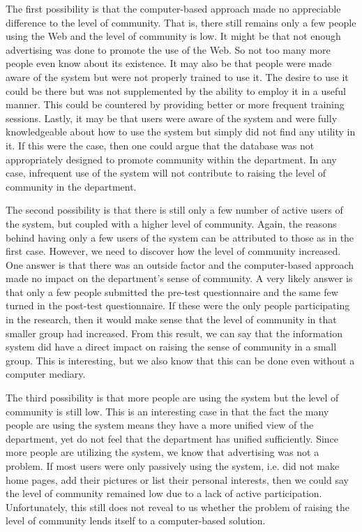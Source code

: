The first possibility is that the computer-based approach made no
appreciable difference to the level of community.  That is, there still
remains only a few people using the Web and the level of community is low.
It might be that not enough advertising was done to promote the use of the
Web.  So not too many more people even know about its existence.  It may
also be that people were made aware of the system but were not properly
trained to use it.  The desire to use it could be there but was not
supplemented by the ability to employ it in a useful manner.  This could be
countered by providing better or more frequent training sessions.  Lastly,
it may be that users were aware of the system and were fully knowledgeable
about how to use the system but simply did not find any utility in it.  If
this were the case, then one could argue that the database was not
appropriately designed to promote community within the department.  In any
case, infrequent use of the system will not contribute to raising the level
of community in the department.  

The second possibility is that there is still only a few number of active
users of the system, but coupled with a higher level of community.  Again,
the reasons behind having only a few users of the system can be attributed
to those as in the first case.  However, we need to discover how the level
of community increased.  One answer is that there was an outside factor and
the computer-based approach made no impact on the department's sense of
community.  A very likely answer is that only a few people submitted the
pre-test questionnaire and the same few turned in the post-test
questionnaire.  If these were the only people participating in the
research, then it would make sense that the level of community in that
smaller group had increased.  From this result, we can say that the
information system did have a direct impact on raising the sense of
community in a small group.  This is interesting, but we also know that
this can be done even without a computer mediary.

The third possibility is that more people are using the system but the
level of community is still low.  This is an interesting case in that the
fact the many people are using the system  means they have a more unified
view of the department, yet do not feel that the department has unified
sufficiently.  Since more people are utilizing the system, we know that
advertising was not a problem.  If most users were only passively using the
system, i.e. did not make home pages, add their pictures or list their
personal interests, then we could say the level of community remained low
due to a lack of active participation.  Unfortunately, this still does not
reveal to us whether the problem of raising the level of community lends
itself to a computer-based solution.

